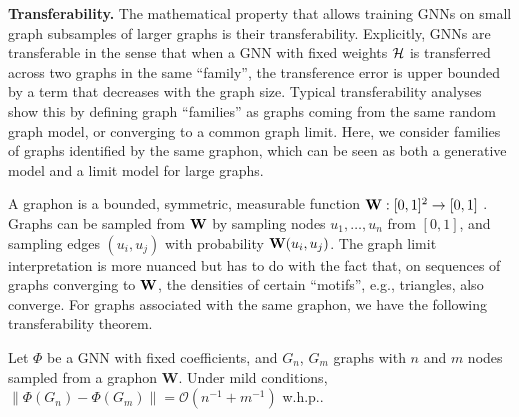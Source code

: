 \noindent \textbf{Transferability.} The mathematical property that allows training GNNs on small graph subsamples of larger graphs is their transferability. Explicitly, GNNs are transferable in the sense that when a GNN with fixed weights ${\mathcal H}$ is transferred across two graphs in the same ``family'', the transference error is upper bounded by a term that decreases with the graph size. Typical transferability analyses show this by defining graph ``families'' as graphs coming from the same random graph model, or converging to a common graph limit. Here, we consider families of graphs identified by the same graphon, which can be seen as both a generative model and a limit model for large graphs. 

A graphon is a bounded, symmetric, measurable function ${\mathbf W}: [0,1]^2 \to [0,1]$ \cite{borgs2008convergent,lovasz2012large}. Graphs can be sampled from ${\mathbf W}$ by sampling nodes $u_1, \ldots, u_n$ from $[0,1]$, and sampling edges $(u_i,u_j)$ with probability ${\mathbf W}(u_i,u_j)$. The graph limit interpretation is more nuanced but has to do with the fact that, on sequences of graphs converging to ${\mathbf W}$, the densities of certain ``motifs'', e.g., triangles, also converge. For graphs associated with the same graphon, we have the following transferability theorem.


\begin{theorem}
    Let $\Phi$ be a GNN with fixed coefficients, and $G_n$, $G_m$ graphs with $n$ and $m$ nodes sampled from a graphon $\mathbf{W}$. Under mild conditions, $\| {\Phi}(G_n) - {\Phi}(G_m) \|= \mathcal{O}(n^{-1} + m^{-1})$ w.h.p..
\end{theorem}

